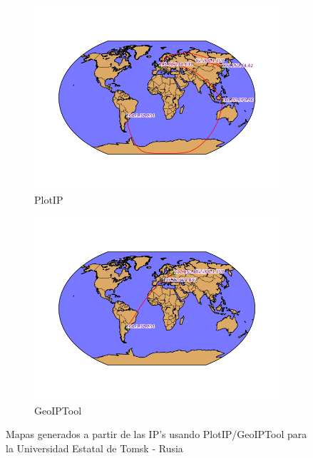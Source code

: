 \begin{figure}[ht]
	\begin{subfigure}[b]{0.5\textwidth}
		\centering
		\includegraphics[width=\linewidth]{imagenes/mapa_tsu_plotip.png}
		\caption{PlotIP}
		\label{fig:mapa_tsu_plotip}
	\end{subfigure} 
	\begin{subfigure}[b]{0.5\textwidth}
		\centering
		\includegraphics[width=\linewidth]{imagenes/mapa_tsu_geoip.png}
		\caption{GeoIPTool}
	\end{subfigure} 
	\caption{Mapas generados a partir de las IP's usando PlotIP/GeoIPTool para la Universidad Estatal de Tomsk - Rusia}
	\label{fig:mapas_tsu}
\end{figure}


